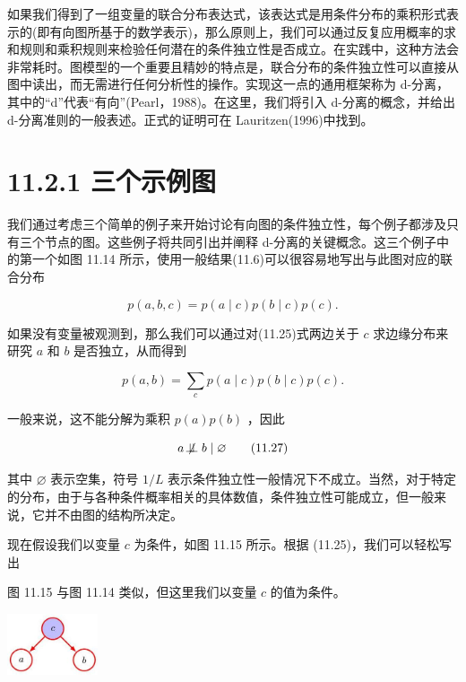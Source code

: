 \documentclass[10pt]{report}
\begin{document}
如果我们得到了一组变量的联合分布表达式，该表达式是用条件分布的乘积形式表示的(即有向图所基于的数学表示)，那么原则上，我们可以通过反复应用概率的求和规则和乘积规则来检验任何潜在的条件独立性是否成立。在实践中，这种方法会非常耗时。图模型的一个重要且精妙的特点是，联合分布的条件独立性可以直接从图中读出，而无需进行任何分析性的操作。实现这一点的通用框架称为 d-分离，其中的“d”代表“有向”(Pearl，1988)。在这里，我们将引入 d-分离的概念，并给出 d-分离准则的一般表述。正式的证明可在 Lauritzen(1996)中找到。

\section*{11.2.1 三个示例图}

我们通过考虑三个简单的例子来开始讨论有向图的条件独立性，每个例子都涉及只有三个节点的图。这些例子将共同引出并阐释 d-分离的关键概念。这三个例子中的第一个如图 11.14 所示，使用一般结果(11.6)可以很容易地写出与此图对应的联合分布

\[
p\left( {a,b,c}\right)  = p\left( {a \mid  c}\right) p\left( {b \mid  c}\right) p\left( c\right) . \tag{11.25}
\]

如果没有变量被观测到，那么我们可以通过对(11.25)式两边关于 \(c\) 求边缘分布来研究 \(a\) 和 \(b\) 是否独立，从而得到

\[
p\left( {a,b}\right)  = \mathop{\sum }\limits_{c}p\left( {a \mid  c}\right) p\left( {b \mid  c}\right) p\left( c\right) . \tag{11.26}
\]

一般来说，这不能分解为乘积 \(p\left( a\right) p\left( b\right)\) ，因此

\[
a \mathrel{ \not \! \perp \!\!\! \perp } b \mid  \varnothing  \tag{11.27}
\]

其中 \(\varnothing\) 表示空集，符号 \(1/L\) 表示条件独立性一般情况下不成立。当然，对于特定的分布，由于与各种条件概率相关的具体数值，条件独立性可能成立，但一般来说，它并不由图的结构所决定。

现在假设我们以变量 \(c\) 为条件，如图 11.15 所示。根据 (11.25)，我们可以轻松写出

图 11.15 与图 11.14 类似，但这里我们以变量 \(c\) 的值为条件。

\begin{center}
\includegraphics[max width=0.2\textwidth]{images/0194e279-9b28-703a-88f4-c3ac21e2010d_358_1287_347_264_179_0.jpg}
\end{center}
\hspace*{3em} 
\end{document}
